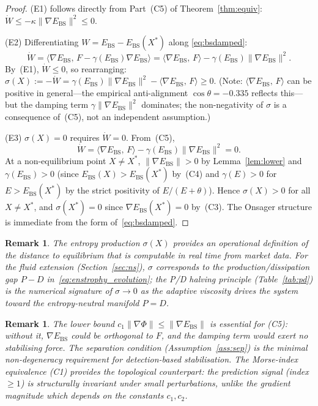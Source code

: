 \documentclass[final]{siamltex}
\newcommand{\norm}[1]{\lVert #1 \rVert}
\newcommand{\inner}[2]{\langle #1,\, #2 \rangle}
\providecommand{\grad}{\nabla}
\newcommand{\Ebs}{E_{\mathrm{BS}}}
\newcommand{\Xst}{X^*}
\newcommand{\costheta}{\cos\theta}
\newtheorem{remark}[theorem]{Remark}
\begin{document}
\begin{proof}
(E1) follows directly from Part~(C5) of Theorem~\ref{thm:equiv}:
$\dot{W} \le -\kappa\norm{\grad\Ebs}^2 \le 0$.

(E2) Differentiating $W = \Ebs - \Ebs(\Xst)$ along
\eqref{eq:bsdamped}:
\[
  \dot{W} = \inner{\grad\Ebs}{F - \gamma(\Ebs)\grad\Ebs}
  = \inner{\grad\Ebs}{F} - \gamma(\Ebs)\norm{\grad\Ebs}^2.
\]
By~(E1), $\dot{W}\le 0$, so rearranging:
$\sigma(X) := -\dot{W} = \gamma(\Ebs)\norm{\grad\Ebs}^2
- \inner{\grad\Ebs}{F} \ge 0$.
(Note: $\inner{\grad\Ebs}{F}$ can be positive in general---the
empirical anti-alignment $\costheta = -0.335$ reflects this---but
the damping term $\gamma\norm{\grad\Ebs}^2$ dominates; the
non-negativity of $\sigma$ is a consequence of~(C5), not an
independent assumption.)

(E3) $\sigma(X)=0$ requires $\dot{W} = 0$. From~(C5),
\[
  \dot{W}
  = \inner{\grad\Ebs}{F} - \gamma(\Ebs)\norm{\grad\Ebs}^2 = 0.
\]
At a non-equilibrium point $X \neq \Xst$,
$\norm{\grad\Ebs} > 0$ by Lemma~\ref{lem:lower} and
$\gamma(\Ebs) > 0$ (since $\Ebs(X) > \Ebs(\Xst)$ by~(C4) and
$\gamma(E) > 0$ for $E > \Ebs(\Xst)$ by the strict positivity
of $E/(E{+}\theta)$).  Hence $\sigma(X) > 0$ for all
$X \neq \Xst$, and $\sigma(\Xst) = 0$ since
$\grad\Ebs(\Xst) = 0$ by~(C3).
The Onsager structure is immediate from the form of~\eqref{eq:bsdamped}.
\end{proof}

\begin{remark}\label{rem:entropy_pd}
The entropy production $\sigma(X)$ provides an operational
definition of the distance to equilibrium that is computable in
real time from market data. For the fluid extension
(Section~\ref{sec:ns}), $\sigma$ corresponds to the
production/dissipation gap $P - D$ in~\eqref{eq:enstrophy_evolution};
the P/D halving principle (Table~\ref{tab:pd}) is the numerical
signature of $\sigma \to 0$ as the adaptive viscosity drives the
system toward the entropy-neutral manifold $P = D$.
\end{remark}

\begin{remark}\label{rem:alignment}
The lower bound $c_1\norm{\grad\Phi}\le\norm{\grad\Ebs}$ is
essential for (C5): without it, $\grad\Ebs$ could be orthogonal to
$F$, and the damping term would exert no stabilising force. The
separation condition (Assumption~\ref{ass:sep}) is the minimal
non-degeneracy requirement for detection-based stabilisation.
The Morse-index equivalence (C1) provides the topological
counterpart: the prediction signal (index $\ge 1$) is
structurally invariant under small perturbations, unlike the
gradient magnitude which depends on the constants $c_1, c_2$.
\end{remark}
\end{document}
